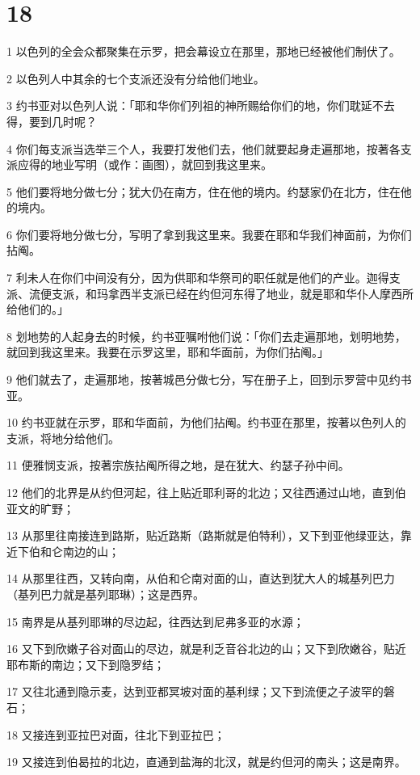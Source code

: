 \chapter{18}

\par 1 以色列的全会众都聚集在示罗，把会幕设立在那里，那地已经被他们制伏了。
\par 2 以色列人中其余的七个支派还没有分给他们地业。
\par 3 约书亚对以色列人说：「耶和华你们列祖的神所赐给你们的地，你们耽延不去得，要到几时呢？
\par 4 你们每支派当选举三个人，我要打发他们去，他们就要起身走遍那地，按著各支派应得的地业写明（或作：画图），就回到我这里来。
\par 5 他们要将地分做七分；犹大仍在南方，住在他的境内。约瑟家仍在北方，住在他的境内。
\par 6 你们要将地分做七分，写明了拿到我这里来。我要在耶和华我们神面前，为你们拈阄。
\par 7 利未人在你们中间没有分，因为供耶和华祭司的职任就是他们的产业。迦得支派、流便支派，和玛拿西半支派已经在约但河东得了地业，就是耶和华仆人摩西所给他们的。」
\par 8 划地势的人起身去的时候，约书亚嘱咐他们说：「你们去走遍那地，划明地势，就回到我这里来。我要在示罗这里，耶和华面前，为你们拈阄。」
\par 9 他们就去了，走遍那地，按著城邑分做七分，写在册子上，回到示罗营中见约书亚。
\par 10 约书亚就在示罗，耶和华面前，为他们拈阄。约书亚在那里，按著以色列人的支派，将地分给他们。
\par 11 便雅悯支派，按著宗族拈阄所得之地，是在犹大、约瑟子孙中间。
\par 12 他们的北界是从约但河起，往上贴近耶利哥的北边；又往西通过山地，直到伯亚文的旷野；
\par 13 从那里往南接连到路斯，贴近路斯（路斯就是伯特利），又下到亚他绿亚达，靠近下伯和仑南边的山；
\par 14 从那里往西，又转向南，从伯和仑南对面的山，直达到犹大人的城基列巴力（基列巴力就是基列耶琳）；这是西界。
\par 15 南界是从基列耶琳的尽边起，往西达到尼弗多亚的水源；
\par 16 又下到欣嫩子谷对面山的尽边，就是利乏音谷北边的山；又下到欣嫩谷，贴近耶布斯的南边；又下到隐罗结；
\par 17 又往北通到隐示麦，达到亚都冥坡对面的基利绿；又下到流便之子波罕的磐石；
\par 18 又接连到亚拉巴对面，往北下到亚拉巴；
\par 19 又接连到伯曷拉的北边，直通到盐海的北汊，就是约但河的南头；这是南界。
